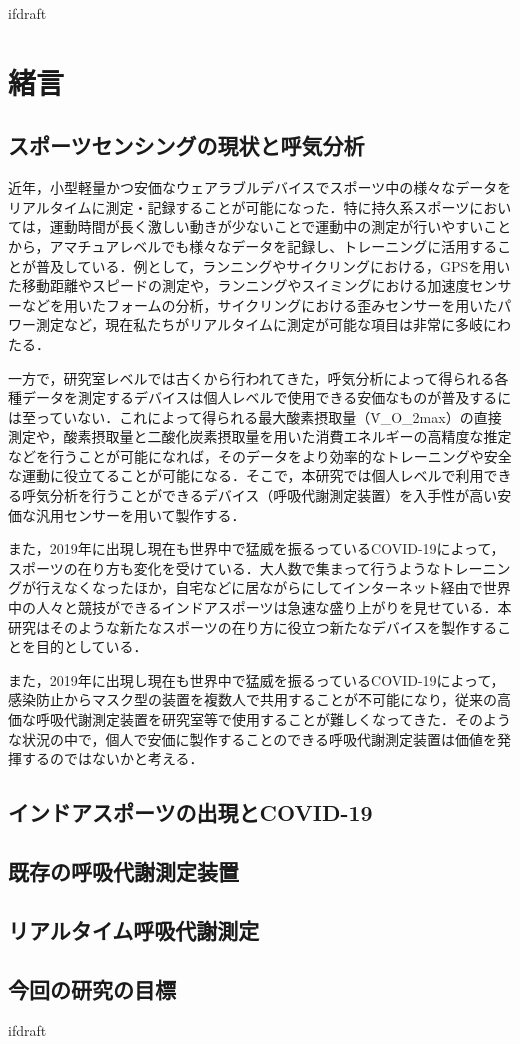 \expandafter\ifx\csname ifdraft\endcsname\relax
 
\fi

\section{緒言}

\subsection{スポーツセンシングの現状と呼気分析}

近年，小型軽量かつ安価なウェアラブルデバイスでスポーツ中の様々なデータをリアルタイムに測定・記録することが可能になった．特に持久系スポーツにおいては，運動時間が長く激しい動きが少ないことで運動中の測定が行いやすいことから，アマチュアレベルでも様々なデータを記録し、トレーニングに活用することが普及している．例として，ランニングやサイクリングにおける，GPSを用いた移動距離やスピードの測定や，ランニングやスイミングにおける加速度センサーなどを用いたフォームの分析，サイクリングにおける歪みセンサーを用いたパワー測定など，現在私たちがリアルタイムに測定が可能な項目は非常に多岐にわたる．

一方で，研究室レベルでは古くから行われてきた，呼気分析によって得られる各種データを測定するデバイスは個人レベルで使用できる安価なものが普及するには至っていない．これによって得られる最大酸素摂取量（\.{V}_{O_2max}）の直接測定や，酸素摂取量と二酸化炭素摂取量を用いた消費エネルギーの高精度な推定などを行うことが可能になれば，そのデータをより効率的なトレーニングや安全な運動に役立てることが可能になる．そこで，本研究では個人レベルで利用できる呼気分析を行うことができるデバイス（呼吸代謝測定装置）を入手性が高い安価な汎用センサーを用いて製作する．

また，2019年に出現し現在も世界中で猛威を振るっているCOVID-19によって，スポーツの在り方も変化を受けている．大人数で集まって行うようなトレーニングが行えなくなったほか，自宅などに居ながらにしてインターネット経由で世界中の人々と競技ができるインドアスポーツは急速な盛り上がりを見せている．本研究はそのような新たなスポーツの在り方に役立つ新たなデバイスを製作することを目的としている．

また，2019年に出現し現在も世界中で猛威を振るっているCOVID-19によって，感染防止からマスク型の装置を複数人で共用することが不可能になり，従来の高価な呼吸代謝測定装置を研究室等で使用することが難しくなってきた．そのような状況の中で，個人で安価に製作することのできる呼吸代謝測定装置は価値を発揮するのではないかと考える．

\subsection{インドアスポーツの出現とCOVID-19}

\subsection{既存の呼吸代謝測定装置}

\subsection{リアルタイム呼吸代謝測定}

\subsection{今回の研究の目標}


\expandafter\ifx\csname ifdraft\endcsname\relax
  
\fi
